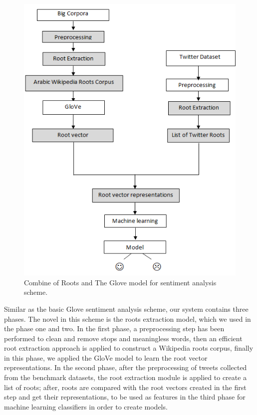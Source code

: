 \documentclass[conference]{IEEEtran}
\begin{document}
	\begin{figure}[htbp]
		\centerline{\includegraphics[scale=0.70]{RootGloveSA.png}}
		\caption{Combine of Roots and The Glove model for sentiment analysis scheme.}
		\label{fig}
		
	\end{figure}
	Similar as the basic Glove sentiment analysis scheme, our system contains three phases. The novel in this scheme is the roots extraction model, which we used in the phase one and two. In the first phase, a preprocessing step has been performed to clean and remove stops and meaningless words, then an efficient root extraction approach is applied to construct a Wikipedia roots corpus, finally in this phase, we applied the GloVe model to learn the root vector representations. In the second phase, after the preprocessing of tweets collected from the benchmark datasets, the root extraction module is applied to create a list of roots; after, roots are compared with the root vectors created in the first step and get their representations, to be used as features in the third phase for machine learning classifiers in order to create models.
	
\end{document}
